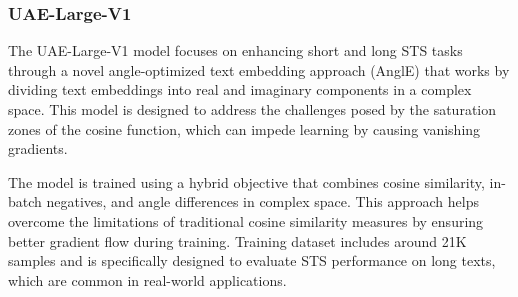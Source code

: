 
\subsubsection{UAE-Large-V1} \label{model-uae-large-v1}
The UAE-Large-V1 model \cite{li2024angleoptimized} focuses on enhancing short and long \ac{STS} tasks through a novel angle-optimized text embedding approach (AnglE) that works by dividing text embeddings into real and imaginary components in a complex space.
This model is designed to address the challenges posed by the saturation zones of the cosine function, which can impede learning by causing vanishing gradients.

The model is trained using a hybrid objective that combines cosine similarity, in-batch negatives, and angle differences in complex space.
This approach helps overcome the limitations of traditional cosine similarity measures by ensuring better gradient flow during training.
Training dataset includes around 21K samples and is specifically designed to evaluate \ac{STS} performance on long texts, which are common in real-world applications.

